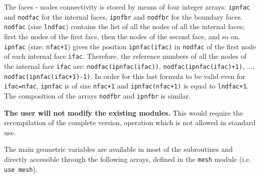 {{{\label{prg_nodfac}
The faces - nodes connectivity is stored by
means of four integer arrays: \texttt{ipnfac} and \texttt{nodfac} for the
internal faces, \texttt{ipnfbr} and \texttt{nodfbr} for the boundary faces.
\texttt{nodfac} (size \texttt{lndfac})
contains the list of all the nodes of all the internal faces; first the nodes of
the first face, then the nodes of the second face, and so on.
\texttt{ipnfac} (size: \texttt{nfac+1}) gives the position \texttt{ipnfac(ifac)}
in \texttt{nodfac} of the first node of each internal face \texttt{ifac}.
Therefore, the reference numbers of all
the nodes of the internal face \texttt{ifac} are: \texttt{nodfac(ipnfac(ifac))},
\texttt{nodfac(ipnfac(ifac)+1)}, ..., \texttt{nodfac(ipnfac(ifac+1)-1)}.
In order for this last formula to be valid even for \texttt{ifac=nfac},
\texttt{ipnfac} is of size \texttt{nfac+1} and \texttt{ipnfac(nfac+1)}
is equal to \texttt{lndfac+1}.\\
The composition of the arrays \texttt{nodfbr} and \texttt{ipnfbr} is similar.

{\bf The user will not modify the existing modules.} This would require the
recompilation of the complete version, operation which is not allowed in
standard use.


The main geometric variables are available in most of the
subroutines and directly accessible through the following arrays,
defined in the \texttt{mesh} module (i.e. \texttt{use mesh}).







}}}
